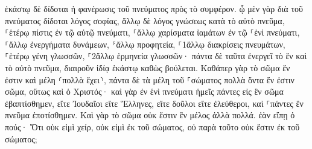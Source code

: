 \documentclass{openreader}
\begin{document}
ἑκάστῳ δὲ δίδοται ἡ φανέρωσις τοῦ πνεύματος πρὸς τὸ συμφέρον. 
ᾧ μὲν γὰρ διὰ τοῦ πνεύματος δίδοται λόγος σοφίας, ἄλλῳ δὲ λόγος γνώσεως κατὰ τὸ αὐτὸ πνεῦμα, 
⸀ἑτέρῳ πίστις ἐν τῷ αὐτῷ πνεύματι, ⸀ἄλλῳ χαρίσματα ἰαμάτων ἐν τῷ ⸀ἑνὶ πνεύματι, 
⸀ἄλλῳ ἐνεργήματα δυνάμεων, ⸁ἄλλῳ προφητεία, ⸀1ἄλλῳ διακρίσεις πνευμάτων, ⸀ἑτέρῳ γένη γλωσσῶν, ⸀2ἄλλῳ ἑρμηνεία γλωσσῶν· 
πάντα δὲ ταῦτα ἐνεργεῖ τὸ ἓν καὶ τὸ αὐτὸ πνεῦμα, διαιροῦν ἰδίᾳ ἑκάστῳ καθὼς βούλεται. 
Καθάπερ γὰρ τὸ σῶμα ἕν ἐστιν καὶ μέλη ⸂πολλὰ ἔχει⸃, πάντα δὲ τὰ μέλη τοῦ ⸀σώματος πολλὰ ὄντα ἕν ἐστιν σῶμα, οὕτως καὶ ὁ Χριστός· 
καὶ γὰρ ἐν ἑνὶ πνεύματι ἡμεῖς πάντες εἰς ἓν σῶμα ἐβαπτίσθημεν, εἴτε Ἰουδαῖοι εἴτε Ἕλληνες, εἴτε δοῦλοι εἴτε ἐλεύθεροι, καὶ ⸀πάντες ἓν πνεῦμα ἐποτίσθημεν. 
Καὶ γὰρ τὸ σῶμα οὐκ ἔστιν ἓν μέλος ἀλλὰ πολλά. 
ἐὰν εἴπῃ ὁ πούς· Ὅτι οὐκ εἰμὶ χείρ, οὐκ εἰμὶ ἐκ τοῦ σώματος, οὐ παρὰ τοῦτο οὐκ ἔστιν ἐκ τοῦ σώματος; 
\end{document}
